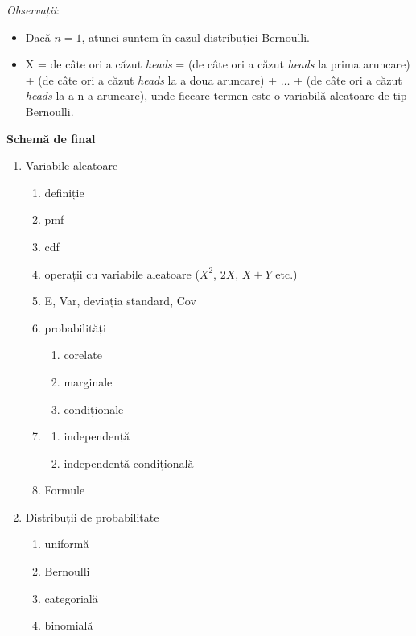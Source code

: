 \documentclass[12pt]{article}
\begin{document}
\begin{itemize}
		\textit{Observații}:
		\begin{itemize}
			\item Dacă $n=1$, atunci suntem în cazul distribuției Bernoulli.
			\item X = de câte ori a căzut \textit{heads} = (de câte ori a căzut \textit{heads} la prima aruncare) + (de câte ori a căzut \textit{heads} la a doua aruncare) + $\dots$ + (de câte ori a căzut \textit{heads} la a n-a aruncare), unde fiecare termen este o variabilă aleatoare de tip Bernoulli.
		\end{itemize}
	\end{itemize}
	\newpage
	\textbf{\large{Schemă de final}}
	\begin{enumerate}
		\item Variabile aleatoare
		\begin{enumerate}
			\item definiție
			\item pmf
			\item cdf
			\item operații cu variabile aleatoare ($X^2$, $2X$, $X+Y$ etc.)
			\item E, Var, deviația standard, Cov
			\item probabilități
			\begin{enumerate}
				\item corelate
				\item marginale
				\item condiționale
			\end{enumerate}
			\item\begin{enumerate}
				\item independență
				\item independență condițională
			\end{enumerate}
			\item Formule
		\end{enumerate}
		\item Distribuții de probabilitate
			\begin{enumerate}
				\item uniformă
				\item Bernoulli
				\item categorială
				\item binomială
			\end{enumerate}
	\end{enumerate}
	
\end{document}
